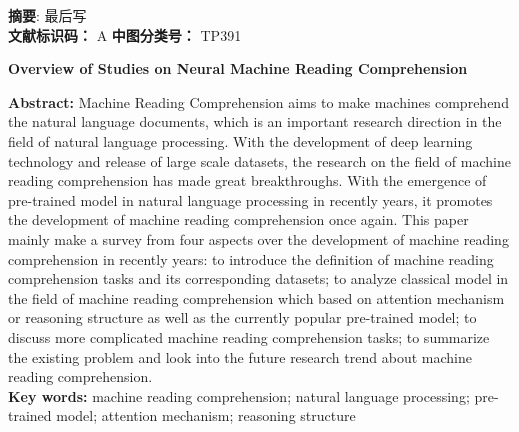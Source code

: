\noindent \textbf{摘\quad 要}: 
最后写\\
\textbf{文献标识码：} A  \qquad \textbf{中图分类号：} TP391
\begin{center}
    \textbf{ Overview of Studies on Neural Machine Reading Comprehension \\}


\end{center}
\textbf{Abstract:} Machine Reading Comprehension aims to make machines comprehend the natural language documents, which 
is an important research direction
 in the field of natural language processing. With the development of deep learning technology and release of large scale datasets, the research on the field of machine reading comprehension has made great breakthroughs. 
 With the emergence of pre-trained model in natural language processing in recently years, it promotes the development of machine reading comprehension once again. This paper mainly make a survey from four aspects over the development of machine reading comprehension in recently years: to introduce the definition of 
  machine reading comprehension tasks and its corresponding datasets; to analyze classical model in the field of machine reading comprehension  
  which based on attention mechanism or reasoning structure as well as the currently 
  popular pre-trained model; to discuss more complicated machine reading comprehension tasks;
   to summarize the existing problem and look into the future research trend about machine reading comprehension. \\
\textbf{Key words:} machine reading comprehension; natural language processing; pre-trained model; attention mechanism; reasoning structure












